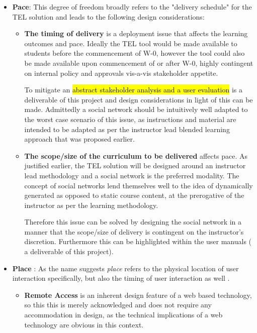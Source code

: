 \begin{itemize}[\null]

\item \textbf{Pace}: This degree of freedom broadly refers to the  "delivery schedule" \cite{Gordon2014} for the TEL solution and leads to the following design considerations:

\begin{itemize}
\item \textbf{The timing of delivery} is a deployment issue that affects the learning outcomes and pace. Ideally the TEL tool would be made available to students before the commencement of W-0, however the tool could also be made available upon commencement of or after W-0, highly contingent on internal policy and approvals vis-a-vis stakeholder appetite.

To mitigate an \hl{abstract stakeholder analysis and a user evaluation} is a deliverable of this project and design considerations in light of this can be made. Admittedly a social network should be intuitively well adapted to the worst case scenario of this issue, as instructions and material are intended to be adapted as per the instructor lead blended learning approach that was proposed earlier.

\item \textbf{The scope/size of the curriculum to be delivered} affects pace. As justified earlier, the TEL solution will be designed around an instructor lead methodology and a social network is the preferred modality. The concept of social networks lend themselves  well to the idea of dynamically generated as opposed to static course content, at the prerogative of the instructor as per the learning methodology.

Therefore this issue can be solved by designing the social network in a manner that the scope/size of delivery is contingent on the instructor's discretion. Furthermore this can be highlighted within the user manuals ( a deliverable of this project).

\end{itemize}

\item \textbf{Place} : As the name suggests \textit{place} refers to the physical location of user interaction specifically, but also the timing of user interaction as well \cite{Gordon2014}.

\begin{itemize}

\item \textbf{Remote Access} is an inherent design feature of a web based technology, so this this is merely acknowledged and does not require any accommodation in design, as the technical implications of a web technology are obvious in this context.



\end{itemize}
\end{itemize}
